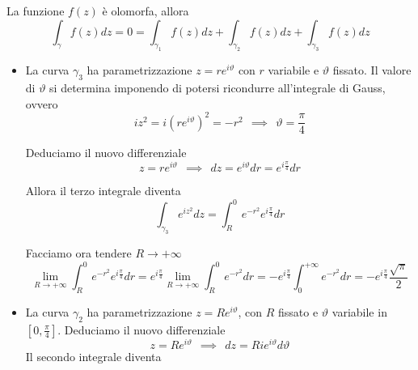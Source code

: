 La funzione $f\left(z\right)$ è olomorfa, allora
\begin{equation*}
{\displaystyle \int\nolimits _{\gamma } f\left(z\right) dz = 0 = \int\nolimits _{\gamma _{1}} f\left(z\right) dz + \int\nolimits _{\gamma _{2}} f\left(z\right) dz + \int\nolimits _{\gamma _{3}} f}\left(z\right) dz
\end{equation*}
\begin{itemize}
\item La curva $\gamma _{3}$ ha parametrizzazione $z = re^{i\vartheta }$ con $r$ variabile e $\vartheta $ fissato. Il valore di $\vartheta $ si determina imponendo di potersi ricondurre all'integrale di Gauss, ovvero
\begin{equation*}
iz^{2} = i\left(re^{i\vartheta }\right)^{2} = - r^{2} \ \ \implies \ \ \vartheta = \frac{\pi }{4}
\end{equation*}

Deduciamo il nuovo differenziale
\begin{equation*}
z = re^{i\vartheta } \ \ \implies \ \ dz = e^{i\vartheta } dr = e^{i\frac{\pi }{4}} dr
\end{equation*}

Allora il terzo integrale diventa
\begin{equation*}
\int\nolimits _{\gamma _{3}} e^{iz^{2}} dz = \int\nolimits ^{0}_{R} e^{ - r^{2}} e^{i\frac{\pi }{4}} dr
\end{equation*}

Facciamo ora tendere $R\rightarrow + \infty $
\begin{equation*}
\lim\limits _{R\rightarrow + \infty }\int\nolimits ^{0}_{R} e^{ - r^{2}} e^{i\frac{\pi }{4}} dr = e^{i\frac{\pi }{4}}\lim\limits _{R\rightarrow + \infty }\int\nolimits ^{0}_{R} e^{ - r^{2}} dr = -e^{i\frac{\pi }{4}}\int\nolimits ^{ + \infty }_{0} e^{ - r^{2}} dr = -e^{i\frac{\pi }{4}}\frac{\sqrt{\pi }}{2}
\end{equation*}
\item La curva $\gamma _{2}$ ha parametrizzazione $z = Re^{i\vartheta }$, con $R$ fissato e $\vartheta $ variabile in $\left[ 0,\frac{\pi }{4}\right]$. Deduciamo il nuovo differenziale
\begin{equation*}
z = Re^{i\vartheta } \ \ \implies \ \ dz = Rie^{i\vartheta } d\vartheta 
\end{equation*}Il secondo integrale diventa


\end{itemize}
